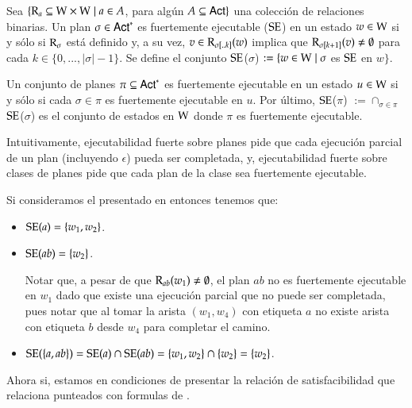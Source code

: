 \begin{definicion}
    Sea $\{\mathrm{R}_a \subseteq \mathrm{W} \times \mathrm{W} \mid a \in A$, para algún $A \subseteq {\rm \sf Act}\}$ una colección de relaciones binarias. Un plan $\sigma \in {\rm \sf Act}^*$
    es fuertemente ejecutable ($\mathrm{SE}$) en un estado $w \in \mathrm{W}$ si y sólo si $\mathrm{R}_\sigma$ está definido y, a su vez, $v \in \mathrm{R}_{\sigma[..k]}(w)$ implica que 
    $\mathrm{R}_{\sigma[k+1]}(v) \neq \emptyset$ para cada $k \in \{0,...,|\sigma|-1\}$. Se define el conjunto $\mathrm{SE}$($\sigma$) $:= \{w \in \mathrm{W} \mid \sigma$ es $\mathrm{SE}$ en $w\}$.
    
    Un conjunto de planes $\pi \subseteq {\rm \sf Act}^*$ es fuertemente ejecutable en un estado $u \in \mathrm{W}$ si y sólo si cada $\sigma \in \pi$ es fuertemente ejecutable en $u$.
    Por último, $\mathrm{SE}$($\pi$) $:= \cap_{\sigma \in \pi}$ $\mathrm{SE}$($\sigma$) es el conjunto de estados en $\mathrm{W}$ donde $\pi$ es fuertemente ejecutable. 
\end{definicion}

Intuitivamente, ejecutabilidad fuerte sobre planes pide que cada ejecución parcial de un plan (incluyendo $\epsilon$) pueda ser completada, y, ejecutabilidad fuerte sobre
clases de planes pide que cada plan de la clase sea fuertemente ejecutable.

\begin{ejemplo}
    Si consideramos el \ults presentado en  entonces tenemos que:
    \begin{itemize}
        \item $\mathrm{SE}(a) = \{w_1,w_2\}$.
        \item $\mathrm{SE}(ab) = \{w_2\}$.

        Notar que, a pesar de que $\mathrm{R}_{ab}(w_1) \neq \emptyset$, el plan $ab$ no es fuertemente ejecutable en $w_1$ 
        dado que existe una ejecución parcial que no puede ser completada, pues notar que al tomar la arista 
        $(w_1,w_4)$ con etiqueta $a$ no existe arista con etiqueta $b$ desde $w_4$ para completar el camino.

        \item $\mathrm{SE}(\{a,ab\}) = \mathrm{SE}(a) \cap \mathrm{SE}(ab) = \{w_1,w_2\} \cap \{w_2\} = \{w_2\}$.
    \end{itemize}
\end{ejemplo}


Ahora si, estamos en condiciones de presentar la relación de satisfacibilidad que relaciona \ultss punteados con formulas de \KHilogic. 

